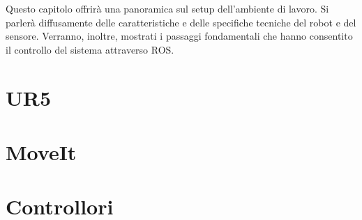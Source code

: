 Questo capitolo offrir\`{a} una panoramica sul setup dell'ambiente di lavoro. 
Si parler\`{a} diffusamente delle caratteristiche e delle specifiche tecniche del robot e del sensore. Verranno, inoltre, 
mostrati i passaggi fondamentali che hanno consentito il controllo del sistema attraverso ROS.

\section{UR5}


\section{MoveIt}


\section{Controllori}
